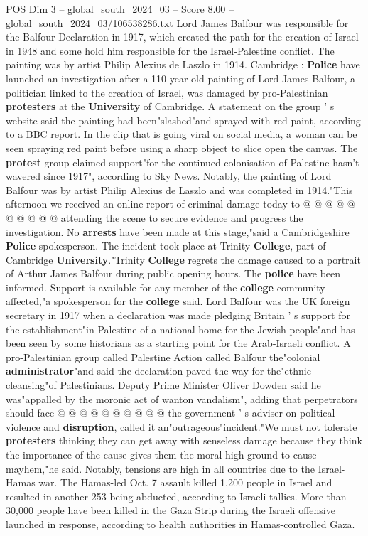 \begin{textsample}{POS Dim 3 – global\_south\_2024\_03 – Score 8.00 – global\_south\_2024\_03/106538286.txt}  \label{ex:f3_pos_421}
Lord James Balfour was responsible for the Balfour Declaration in 1917, which created the path for the creation of Israel in 1948 and some hold him responsible for the Israel-Palestine conflict.
The painting was by artist Philip Alexius de Laszlo in 1914.
Cambridge : \textbf{Police} have launched an investigation after a 110-year-old painting of Lord James Balfour, a politician linked to the creation of Israel, was damaged by pro-Palestinian \textbf{protesters} at the \textbf{University} of Cambridge.
A statement on the group ' s website said the painting had been"slashed"and sprayed with red paint, according to a BBC report.
In the clip that is going viral on social media, a woman can be seen spraying red paint before using a sharp object to slice open the canvas.
The \textbf{protest} group claimed support"for the continued colonisation of Palestine hasn't wavered since 1917", according to Sky News.
Notably, the painting of Lord Balfour was by artist Philip Alexius de Laszlo and was completed in 1914."This afternoon we received an online report of criminal damage today to @ @ @ @ @ @ @ @ @ @ attending the scene to secure evidence and progress the investigation.
No \textbf{arrests} have been made at this stage,"said a Cambridgeshire \textbf{Police} spokesperson.
The incident took place at Trinity \textbf{College}, part of Cambridge \textbf{University}."Trinity \textbf{College} regrets the damage caused to a portrait of Arthur James Balfour during public opening hours.
The \textbf{police} have been informed.
Support is available for any member of the \textbf{college} community affected,"a spokesperson for the \textbf{college} said.
Lord Balfour was the UK foreign secretary in 1917 when a declaration was made pledging Britain ' s support for the establishment"in Palestine of a national home for the Jewish people"and has been seen by some historians as a starting point for the Arab-Israeli conflict.
A pro-Palestinian group called Palestine Action called Balfour the"colonial \textbf{administrator}"and said the declaration paved the way for the"ethnic cleansing"of Palestinians.
Deputy Prime Minister Oliver Dowden said he was"appalled by the moronic act of wanton vandalism", adding that perpetrators should face @ @ @ @ @ @ @ @ @ @ the government ' s adviser on political violence and \textbf{disruption}, called it an"outrageous"incident."We must not tolerate \textbf{protesters} thinking they can get away with senseless damage because they think the importance of the cause gives them the moral high ground to cause mayhem,"he said.
Notably, tensions are high in all countries due to the Israel-Hamas war.
The Hamas-led Oct. 7 assault killed 1,200 people in Israel and resulted in another 253 being abducted, according to Israeli tallies.
More than 30,000 people have been killed in the Gaza Strip during the Israeli offensive launched in response, according to health authorities in Hamas-controlled Gaza.

\end{textsample}
